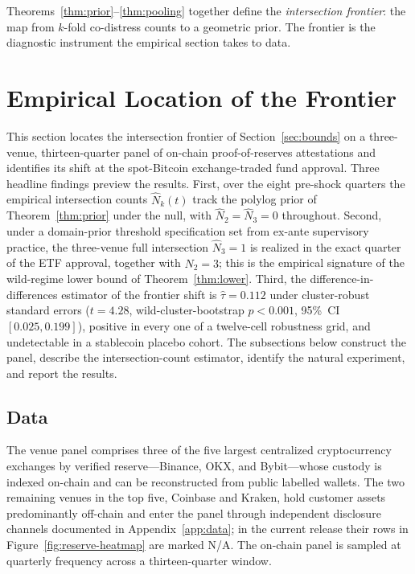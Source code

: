 Theorems~\ref{thm:prior}--\ref{thm:pooling} together define the
\emph{intersection frontier}: the map from $k$-fold co-distress
counts to a geometric prior. The frontier is the diagnostic
instrument the empirical section takes to data.

\section{Empirical Location of the Frontier}\label{sec:empirics}

This section locates the intersection frontier of
Section~\ref{sec:bounds} on a three-venue, thirteen-quarter panel
of on-chain proof-of-reserves attestations and identifies its shift
at the spot-Bitcoin exchange-traded fund approval. Three headline
findings preview the results. First, over the eight pre-shock
quarters the empirical intersection counts $\hat N_k(t)$ track the
polylog prior of Theorem~\ref{thm:prior} under the null, with
$\hat N_2 = \hat N_3 = 0$ throughout. Second, under a domain-prior
threshold specification set from ex-ante supervisory practice, the
three-venue full intersection $\hat N_3 = 1$ is realized in the
exact quarter of the ETF approval, together with $\hat N_2 = 3$;
this is the empirical signature of the wild-regime lower bound of
Theorem~\ref{thm:lower}. Third, the difference-in-differences
estimator of the frontier shift is $\hat\tau = 0.112$ under
cluster-robust standard errors ($t = 4.28$, wild-cluster-bootstrap
$p < 0.001$, 95\%~CI $[0.025, 0.199]$), positive in every one of a
twelve-cell robustness grid, and undetectable in a stablecoin
placebo cohort. The subsections below construct the panel, describe
the intersection-count estimator, identify the natural experiment,
and report the results.

\subsection{Data}\label{sec:data}

The venue panel comprises three of the five largest centralized
cryptocurrency exchanges by verified reserve---Binance, OKX, and
Bybit---whose custody is indexed on-chain and can be reconstructed
from public labelled wallets. The two remaining venues in the top
five, Coinbase and Kraken, hold customer assets predominantly
off-chain and enter the panel through independent disclosure
channels documented in Appendix~\ref{app:data}; in the current
release their rows in Figure~\ref{fig:reserve-heatmap} are marked
N/A. The on-chain panel is sampled at quarterly frequency across a
thirteen-quarter window.

